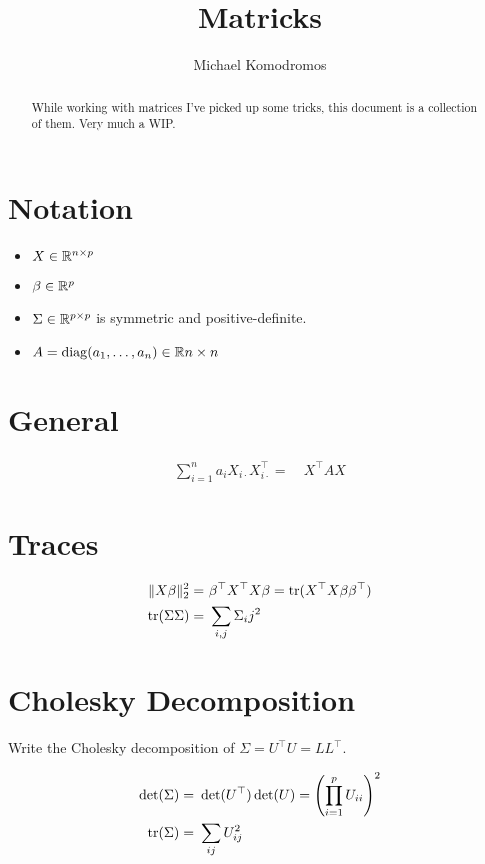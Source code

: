 \documentclass[12pt]{article}
\title{Matricks}
\author{Michael Komodromos}
\begin{document}
\maketitle

\begin{abstract}
While working with matrices I've picked up some tricks, this document is a collection of them. Very much a WIP.
\end{abstract}

\section{Notation}

\begin{itemize}
    \item $X \in \mathbb{R}^{n \times p}$
    \item $\beta \in \mathbb{R}^p$
    \item $\Sigma \in \mathbb{R}^{p \times p}$ is symmetric and positive-definite.
    \item $A = \operatorname{diag}(a_1, \dots, a_n) \in \mathbb{R}{n \times n}$
\end{itemize}



\section{General}

\begin{align}
    \sum_{i=1}^n a_i X_{i \cdot} X_{i \cdot}^\top = &\ X^\top AX
\end{align}

\section{Traces}

\begin{align}
    \| X \beta \|_2^2 = &\ \beta^\top X^\top X \beta = \operatorname{tr}(X^\top X \beta \beta^\top) \\
    \operatorname{tr}(\Sigma \Sigma) = &\ \sum_{i, j} \Sigma_ij^2
\end{align}


\section{Cholesky Decomposition}

Write the Cholesky decomposition of $\Sigma = U^\top U = LL^\top$.

\begin{align}
    \det(\Sigma) = &\ \det(U^\top) \det(U) = \left( \prod_{i=1}^p U_{ii} \right)^2 \\
    \operatorname{tr} (\Sigma) = &\ \sum_{ij} U_{ij}^2
\end{align}
\end{document}
